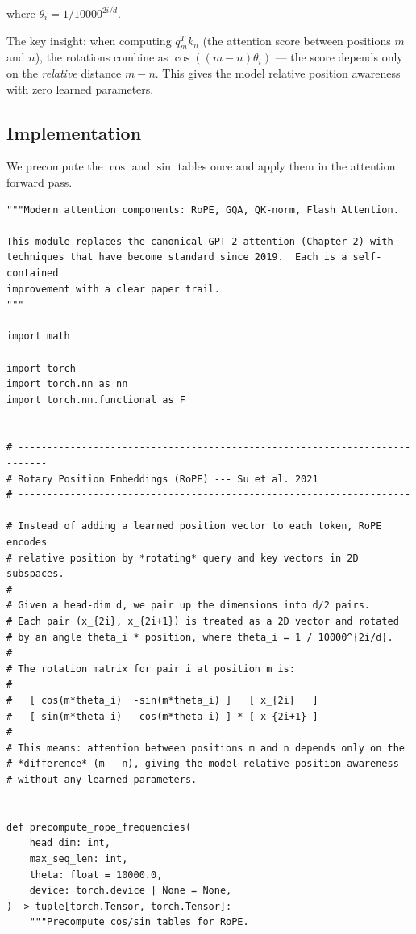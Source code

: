 where $\theta_i = 1 / 10000^{2i/d}$.

The key insight: when computing $q_m^T k_n$ (the attention score between positions $m$ and $n$), the rotations combine as $\cos((m-n)\theta_i)$ --- the score depends only on the \emph{relative} distance $m - n$.  This gives the model relative position awareness with zero learned parameters.

\subsection{Implementation}

We precompute the $\cos$ and $\sin$ tables once and apply them in the attention forward pass.

\begin{lstlisting}
"""Modern attention components: RoPE, GQA, QK-norm, Flash Attention.

This module replaces the canonical GPT-2 attention (Chapter 2) with
techniques that have become standard since 2019.  Each is a self-contained
improvement with a clear paper trail.
"""

import math

import torch
import torch.nn as nn
import torch.nn.functional as F


# ---------------------------------------------------------------------------
# Rotary Position Embeddings (RoPE) --- Su et al. 2021
# ---------------------------------------------------------------------------
# Instead of adding a learned position vector to each token, RoPE encodes
# relative position by *rotating* query and key vectors in 2D subspaces.
#
# Given a head-dim d, we pair up the dimensions into d/2 pairs.
# Each pair (x_{2i}, x_{2i+1}) is treated as a 2D vector and rotated
# by an angle theta_i * position, where theta_i = 1 / 10000^{2i/d}.
#
# The rotation matrix for pair i at position m is:
#
#   [ cos(m*theta_i)  -sin(m*theta_i) ]   [ x_{2i}   ]
#   [ sin(m*theta_i)   cos(m*theta_i) ] * [ x_{2i+1} ]
#
# This means: attention between positions m and n depends only on the
# *difference* (m - n), giving the model relative position awareness
# without any learned parameters.


def precompute_rope_frequencies(
    head_dim: int,
    max_seq_len: int,
    theta: float = 10000.0,
    device: torch.device | None = None,
) -> tuple[torch.Tensor, torch.Tensor]:
    """Precompute cos/sin tables for RoPE.


\end{lstlisting}
